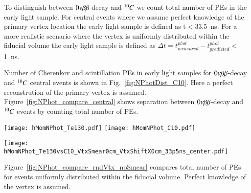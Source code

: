 To distinguish between $0\nu\beta\beta$-decay and $^{10}C$ we count total number of PEs in the 
early light sample. For central events where we assume perfect knowledge of the 
primary vertex location the early light sample is defined as t$<$33.5~ns. For a more 
realistic scenario where the vertex is uniformly distributed within the fiducial volume
the early light sample is defined as $\Delta t=t^{phot}_{measured} - 
t^{phot}_{predicted}<$1~ns.


Number of Cherenkov and scintillation PEs in early light samples for $0\nu\beta\beta$-decay and 
$^{10}C$ central events is shown in Fig.~\ref{fig:NPhotDist_C10}. Here a perfect 
reconstrution of the primary vertex is assumed. Figure~\ref{fig:NPhot_compare_central} shows
separation between $0\nu\beta\beta$-decay and $^{10}C$ events by counting total number of PEs. 

\begin{figure*}[ht]
  \centering
  \texttt{[image: hMomNPhot\_Te130.pdf]}
  \texttt{[image: hMomNPhot\_C10.pdf]}
  \caption{Early photons. Number of Cherenkov (\emph{dashed red line}), 
    scintillation
    (\emph{dotted blue line}), and total (\emph{solid black line}) PEs
    for the simulation of 1000 $^{130}$Te 0{\nbb} decay (left panel)
    and of 648 $^{10}$C (\emph{right panel}) events (1000 $^{10}$C events was 
    generated, but selected only those that has total energy deposition in the 
    detector in the range between 2.1 and 2.9~MeV).}
\label{fig:NPhotDist_C10}
\end{figure*}



\begin{figure*}[ht]
  \centering
  \texttt{[image: hMomNPhot\_Te130vsC10\_VtxSmear0cm\_VtxShiftX0cm\_33p5ns\_center.pdf]}
  \caption{Comparison of total number of early photons between $^{130}$Te 0{\nbb} decay 
    and $^{10}$C events with energy deposition in the range between 2.1 and 2.9~MeV. 
    Events originated at the center of the sphere.
    Perfect vertex reconstruction - true vertex position is used. Time cut of 
    33.5~ns on the photon arrival time is applied.}
\label{fig:NPhot_compare_central}
\end{figure*}


Figure~\ref{fig:NPhot_compare_rndVtx_noSmear} compares total number of PEs for events uniformly 
distributed within the fiducial volume. Perfect knowledge of the vertex is assumed.

